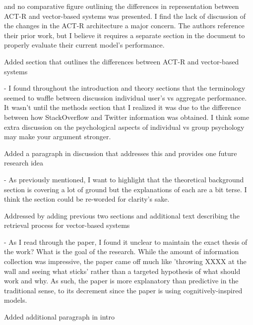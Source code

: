 \documentclass[answers,12pt]{exam}
\begin{document}
\begin{questions}
\question and no comparative figure outlining the differences in representation between ACT-R and vector-based systems was presented. I find the lack of discussion of the changes in the ACT-R architecture a major concern. The authors reference their prior work, but I believe it requires a separate section in the document to properly evaluate their current model's performance. 

\begin{solution}
Added section that outlines the differences between ACT-R and vector-based systems
\end{solution}

\question - I found throughout the introduction and theory sections that the terminology seemed to waffle between discussion individual user's vs aggregate performance. It wasn't until the methods section that I realized it was due to the difference between how StackOverflow and Twitter information was obtained. I think some extra discussion on the psychological aspects of individual vs group psychology may make your argument stronger. 

\begin{solution}
 Added a paragraph in discussion that addresses this and provides one future research idea
\end{solution}

\question - As previously mentioned, I want to highlight that the theoretical background section is covering a lot of ground but the explanations of each are a bit terse. I think the section could be re-worded for clarity's sake.

\begin{solution}
Addressed by adding previous two sections and additional text describing the retrieval process for vector-based systems
\end{solution}

\question - As I read through the paper, I found it unclear to maintain the exact thesis of the work? What is the goal of the research. While the amount of information collection was impressive, the paper came off much like 'throwing XXXX at the wall and seeing what sticks' rather than a targeted hypothesis of what should work and why. As such, the paper is more explanatory than predictive in the traditional sense, to its decrement since the paper is using cognitively-inspired models.

\begin{solution}
Added additional paragraph in intro
\end{solution}


\end{questions}
\end{document}
